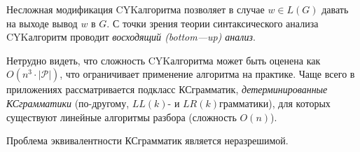 \begin{NumRemark} Несложная модификация CYK\nbdash{}алгоритма позволяет в случае $w \in
L(G)$ давать на выходе вывод $w$ в $G$. С точки зрения теории синтаксического анализа
CYK\nbdash{}алгоритм проводит \emph{восходящий (bottom—up) анализ}.
\end{NumRemark}

\begin{NumRemark}
Нетрудно видеть, что сложность CYK\nbdash{}алгоритма может быть оценена как
$O(n^3 \cdot |\mathcal P|)$, что ограничивает применение алгоритма на практике.
Чаще всего в приложениях рассматривается подкласс КС\nbdash{}грамматик,
\emph{детерминированные КС\nbdash{}грамматики} (по-другому, $LL(k)$- и
$LR(k)$\nbdash{}грамматики), для которых существуют линейные алгоритмы разбора
(сложность $O(n)$).
\end{NumRemark} 

\begin{Proposition}
Проблема эквивалентности КС\nbdash{}грамматик является неразрешимой.
\end{Proposition}